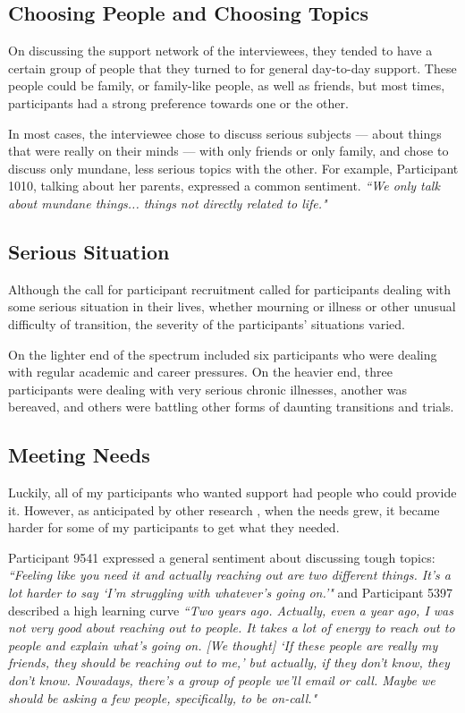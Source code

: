   \subsection{Choosing People and Choosing Topics}
  On discussing the support network of the interviewees,
  they tended to have a certain group of people that they turned to for
  general day-to-day support.
  These people could be family, or family-like people, as well as friends,
  but most times, participants had a strong preference towards one or the other.

  In most cases, the interviewee chose to discuss serious subjects ---
  about things that were really on their minds ---
  with only friends or only family,
  and chose to discuss only mundane, less serious topics with the other.
  For example, Participant 1010, talking about her parents,
  expressed a common sentiment.
  \textit{
  ``We only talk about mundane things...
  things not directly related to life."
  }

  \subsection{Serious Situation}
  Although the call for participant recruitment called for participants
  dealing with some serious situation in their lives,
  whether mourning or illness or other unusual difficulty of transition,
  the severity of the participants' situations varied.

  On the lighter end of the spectrum included six participants who were
  dealing with regular academic and career pressures.
  On the heavier end,
  three participants were dealing with very serious chronic illnesses,
  another was bereaved,
  and others were battling other forms of daunting transitions and trials.

  \subsection{Meeting Needs}
  Luckily, all of my participants who wanted support had people
  who could provide it.
  However, as anticipated by other research \cite{skeels10},
  when the needs grew, it became harder for some of my participants to get
  what they needed.

  Participant 9541 expressed a general sentiment about discussing tough topics:
  \textit{
  ``Feeling like you need it and actually reaching out are two different things.
  It's a lot harder to say `I'm struggling with whatever's going on.'"
  } and Participant 5397 described a high learning curve
  \textit{
  ``Two years ago.
  Actually, even a year ago, I was not very good about reaching out to people.
  It takes a lot of energy to reach out to people and explain what's going on.
  [We thought]
  `If these people are really my friends, they should be reaching out to me,'
  but actually, if they don't know, they don't know.
  Nowadays, there's a group of people we'll email or call.
  Maybe we should be asking a few people, specifically, to be on-call."
  }

